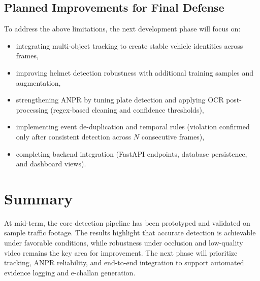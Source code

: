 \subsection{Planned Improvements for Final Defense}
To address the above limitations, the next development phase will focus on:
\begin{itemize}
    \item integrating multi-object tracking to create stable vehicle identities across frames,
    \item improving helmet detection robustness with additional training samples and augmentation,
    \item strengthening ANPR by tuning plate detection and applying OCR post-processing (regex-based cleaning and confidence thresholds),
    \item implementing event de-duplication and temporal rules (violation confirmed only after consistent detection across $N$ consecutive frames),
    \item completing backend integration (FastAPI endpoints, database persistence, and dashboard views).
\end{itemize}

\section{Summary}
\label{sec:results-summary}

At mid-term, the core detection pipeline has been prototyped and validated on sample traffic footage. The results highlight that accurate detection is achievable under favorable conditions, while robustness under occlusion and low-quality video remains the key area for improvement. The next phase will prioritize tracking, ANPR reliability, and end-to-end integration to support automated evidence logging and e-challan generation.
